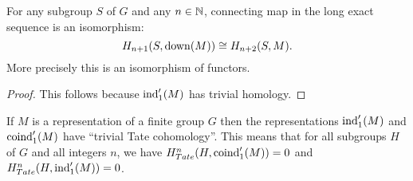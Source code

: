 \begin{lemma}	\label{lem:down iso}
	\leanok
	For any subgroup $S$ of $G$ and any $n \in {\mathbb N}$, connecting
	map in the long exact sequence is an isomorphism:
	\[
		H_{n+1}(S,\mathrm{down}(M)) \cong H_{n+2}(S,M).
	\]
	More precisely this is an isomorphism of functors.
\end{lemma}

\begin{proof}
	This follows because $\mathrm{ind}_1'(M)$ has trivial homology.
\end{proof}

\begin{lemma} \label{lem:ind₁' coind₁' trivial Tate}
	\leanok
	If $M$ is a representation of a finite group $G$ then the representations
	$\mathrm{ind}_1'(M)$ and $\mathrm{coind}_1'(M)$ have ``trivial Tate cohomology''.
	This means that for all
	subgroups $H$ of $G$ and all integers $n$, we have
	$H^n_{Tate}(H,\mathrm{coind}_1'(M)) = 0$ and $H^n_{Tate}(H,\mathrm{ind}_1'(M)) = 0$.
\end{lemma}


